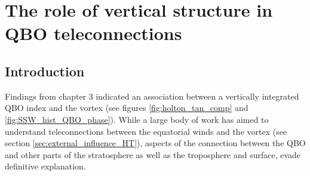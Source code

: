 \chapter{The role of vertical structure in QBO teleconnections}
\label{cha:deepQBO}

\section{Introduction}
\label{sec:deepQBO-introduction}

Findings from chapter 3 indicated an association between a vertically integrated QBO index and the vortex (see figures \ref{fig:holton_tan_comp} and \ref{fig:SSW_hist_QBO_phase}). While a large body of work has aimed to understand teleconnections between the equatorial winds and the vortex (see section \ref{sec:external_influence_HT}), aspects of the connection between the QBO and other parts of the stratosphere as well as the troposphere and surface, evade definitive explanation.

